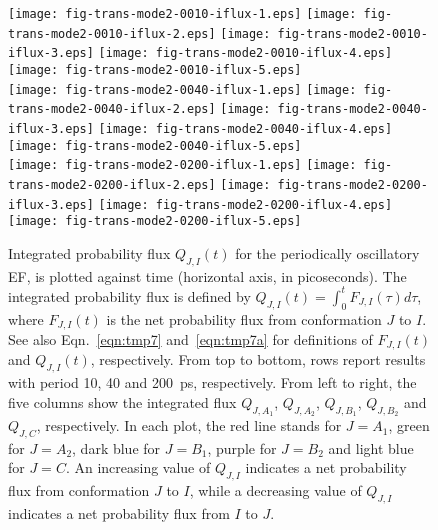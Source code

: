 \documentclass[a4paper,preprint,unsortedaddress,onecolumn]{revtex4-1}
\begin{document}
\begin{figure}
  \centering
  \texttt{[image: fig-trans-mode2-0010-iflux-1.eps]}
  \texttt{[image: fig-trans-mode2-0010-iflux-2.eps]}
  \texttt{[image: fig-trans-mode2-0010-iflux-3.eps]}
  \texttt{[image: fig-trans-mode2-0010-iflux-4.eps]}
  \texttt{[image: fig-trans-mode2-0010-iflux-5.eps]}\\
  \texttt{[image: fig-trans-mode2-0040-iflux-1.eps]}
  \texttt{[image: fig-trans-mode2-0040-iflux-2.eps]}
  \texttt{[image: fig-trans-mode2-0040-iflux-3.eps]}
  \texttt{[image: fig-trans-mode2-0040-iflux-4.eps]}
  \texttt{[image: fig-trans-mode2-0040-iflux-5.eps]}\\
  \texttt{[image: fig-trans-mode2-0200-iflux-1.eps]}
  \texttt{[image: fig-trans-mode2-0200-iflux-2.eps]}
  \texttt{[image: fig-trans-mode2-0200-iflux-3.eps]}
  \texttt{[image: fig-trans-mode2-0200-iflux-4.eps]}
  \texttt{[image: fig-trans-mode2-0200-iflux-5.eps]}\\
  \caption{
    Integrated probability flux $Q_{J,I}(t)$ for the periodically
    oscillatory EF, is plotted against time (horizontal axis, in picoseconds).
    The integrated
    probability flux is defined by $Q_{J,I}(t) = \int_0^t F_{J,I}(\tau) d\tau$, where
    $F_{J,I}(t)$ is the net probability flux from conformation $J$ to $I$.
    See also Eqn.~\eqref{eqn:tmp7} and~\eqref{eqn:tmp7a} for definitions
    of $F_{J,I}(t)$ and $Q_{J,I}(t)$, respectively.
    From top to bottom, rows report results with  period 10, 40 and 200~ps, respectively.
    From left to right, the five
    columns show the integrated flux $Q_{J,A_1}$, $Q_{J,A_2}$,
    $Q_{J,B_1}$, $Q_{J,B_2}$ and $Q_{J,C}$, respectively. In each plot,
    the red line stands for $J=A_1$, green for $J=A_2$, dark blue for $J=B_1$,
    purple for $J=B_2$ and light blue for $J=C$.
    An increasing value of $Q_{J,I}$ indicates a net probability
      flux from conformation $J$ to $I$,
      while a decreasing value of $Q_{J,I}$ indicates a net probability
      flux from $I$ to $J$.
  }
  \label{fig:tmp10}
\end{figure}
\end{document}
